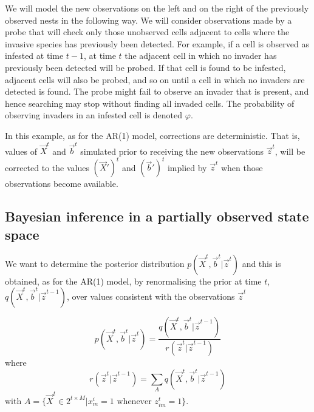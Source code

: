 We will model the new observations on the left and on the right of the previously observed nests in the following way. We will consider observations made by a probe that will check only those unobserved cells adjacent to cells where the invasive species has previously been detected. For example, if a cell is observed as infested at time $t-1$, at time $t$ the adjacent cell in which no invader has previously been detected will be probed. If that cell is found to be infested, adjacent cells will also be probed, and so on until a cell in which no invaders are detected is found. The probe might fail to observe an invader that is present, and hence searching may stop without finding all invaded cells. The probability of observing invaders in an infested cell is denoted $\varphi$. 

In this example, as for the AR(1) model, corrections are deterministic. That is, values of $\vec{X}^t$ and $\vec{b}^t$ simulated prior to receiving the new observations $\vec{z}^t$, will be corrected to the values $(\vec{X}')^t$ and $(\vec{b}')^t$ implied by $\vec{z}^t$ when those observations become available.

\subsection{Bayesian inference in a partially observed state space}
\label{sec:8}

We want to determine the posterior distribution $p(\vec{X}^{t}, \vec{b}^{t} | \vec{z}^{t})$ and this is obtained, as for the AR(1) model, by renormalising the prior at time $t$, $q(\vec{X}^{t}, \vec{b}^{t} | \vec{z}^{t-1})$, over values consistent with the observations $\vec{z}^{t}$

\begin{equation*}
    p(\vec{X}^{t}, \vec{b}^{t} | \vec{z}^{t})  =  \frac{q(\vec{X}^{t}, \vec{b}^{t} | \vec{z}^{t-1})}{r(\vec{z}^{t} | \vec{z}^{t-1})}
\end{equation*}
where 
\begin{equation*}
    r(\vec{z}^{t} | \vec{z}^{t-1}) = \sum_A q(\vec{X}^{t}, \vec{b}^{t} | \vec{z}^{t-1})
\end{equation*}
with $A = \{ \vec{X}^t \in 2^{t \times M} | x^i_m = 1 \mbox{ whenever } z_{im}^t = 1 \}$.

